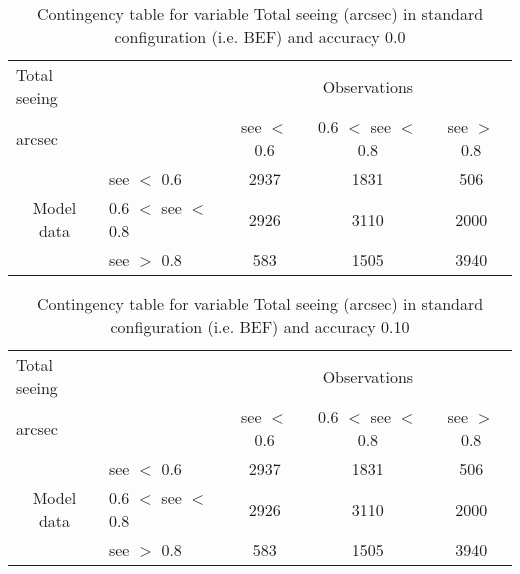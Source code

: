 \documentclass[11pt,english]{article}
\begin{document}
\clearpage
\begin{table}[]
\begin{center}
\begin{tabular}{llccc}
\hline
{Total seeing}                                       &                                                    & \multicolumn{3}{c}{Observations}                 \\
{arcsec}                                       &                             & see $<$ 0.6   & 0.6 $<$ see $<$ 0.8 & see $>$ 0.8 \\
\hline
\multicolumn{1}{c}{\multirow{3}{*}{Model data}}  & see $<$ 0.6             & 2937                & 1831                       & 506              \\
                                                 & 0.6  $<$ see $<$ 0.8 & 2926                & 3110                       & 2000              \\
                                                 & see $>$ 0.8             & 583                & 1505                       & 3940              \\
\hline
\end{tabular}
\end{center}
\caption{Contingency table for variable Total seeing (arcsec) in standard configuration (i.e. BEF) and accuracy 0.0}
\label{tab:contingencyseeBEF}
\end{table}
\begin{table}[]
\begin{center}
\begin{tabular}{llccc}
\hline
{Total seeing}                                       &                                                    & \multicolumn{3}{c}{Observations}                 \\
{arcsec}                                       &                             & see $<$ 0.6   & 0.6 $<$ see $<$ 0.8 & see $>$ 0.8 \\
\hline
\multicolumn{1}{c}{\multirow{3}{*}{Model data}}  & see $<$ 0.6             & 2937                & 1831                       & 506              \\
                                                 & 0.6  $<$ see $<$ 0.8 & 2926                & 3110                       & 2000              \\
                                                 & see $>$ 0.8             & 583                & 1505                       & 3940              \\
\hline
\end{tabular}
\end{center}
\caption{Contingency table for variable Total seeing (arcsec) in standard configuration (i.e. BEF) and accuracy 0.10}
\label{tab:contingencyseeBEF}
\end{table}
\end{document}
